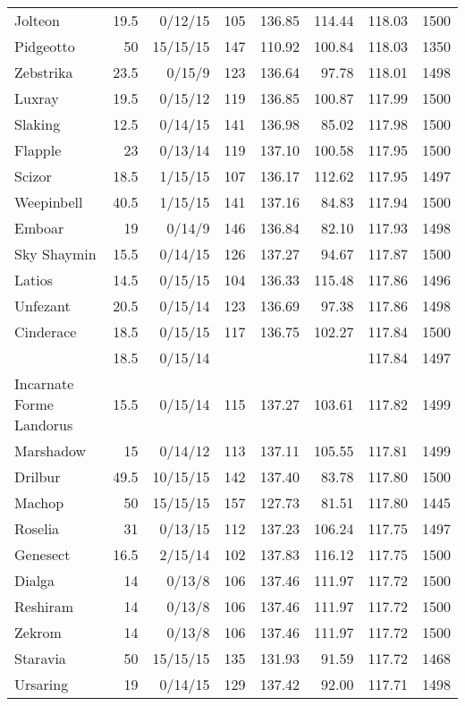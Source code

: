 \begin{longtable}{lrrrrrrr}
Jolteon & 19.5 & 0/12/15 & 105 & 136.85 & 114.44 & 118.03 & 1500\\
Pidgeotto & 50 & 15/15/15 & 147 & 110.92 & 100.84 & 118.03 & 1350\\
Zebstrika & 23.5 & 0/15/9 & 123 & 136.64 & 97.78 & 118.01 & 1498\\
Luxray & 19.5 & 0/15/12 & 119 & 136.85 & 100.87 & 117.99 & 1500\\
Slaking & 12.5 & 0/14/15 & 141 & 136.98 & 85.02 & 117.98 & 1500\\
Flapple & 23 & 0/13/14 & 119 & 137.10 & 100.58 & 117.95 & 1500\\
Scizor & 18.5 & 1/15/15 & 107 & 136.17 & 112.62 & 117.95 & 1497\\
Weepinbell & 40.5 & 1/15/15 & 141 & 137.16 & 84.83 & 117.94 & 1500\\
Emboar & 19 & 0/14/9 & 146 & 136.84 & 82.10 & 117.93 & 1498\\
Sky Shaymin & 15.5 & 0/14/15 & 126 & 137.27 & 94.67 & 117.87 & 1500\\
Latios & 14.5 & 0/15/15 & 104 & 136.33 & 115.48 & 117.86 & 1496\\
Unfezant & 20.5 & 0/15/14 & 123 & 136.69 & 97.38 & 117.86 & 1498\\
Cinderace & 18.5 & 0/15/15 & 117 & 136.75 & 102.27 & 117.84 & 1500\\
 & 18.5 & 0/15/14 & & & & 117.84 & 1497\\
Incarnate Forme Landorus & 15.5 & 0/15/14 & 115 & 137.27 & 103.61 & 117.82 & 1499\\
Marshadow & 15 & 0/14/12 & 113 & 137.11 & 105.55 & 117.81 & 1499\\
Drilbur & 49.5 & 10/15/15 & 142 & 137.40 & 83.78 & 117.80 & 1500\\
Machop & 50 & 15/15/15 & 157 & 127.73 & 81.51 & 117.80 & 1445\\
Roselia & 31 & 0/13/15 & 112 & 137.23 & 106.24 & 117.75 & 1497\\
Genesect & 16.5 & 2/15/14 & 102 & 137.83 & 116.12 & 117.75 & 1500\\
Dialga & 14 & 0/13/8 & 106 & 137.46 & 111.97 & 117.72 & 1500\\
Reshiram & 14 & 0/13/8 & 106 & 137.46 & 111.97 & 117.72 & 1500\\
Zekrom & 14 & 0/13/8 & 106 & 137.46 & 111.97 & 117.72 & 1500\\
Staravia & 50 & 15/15/15 & 135 & 131.93 & 91.59 & 117.72 & 1468\\
Ursaring & 19 & 0/14/15 & 129 & 137.42 & 92.00 & 117.71 & 1498\\

\end{longtable}
